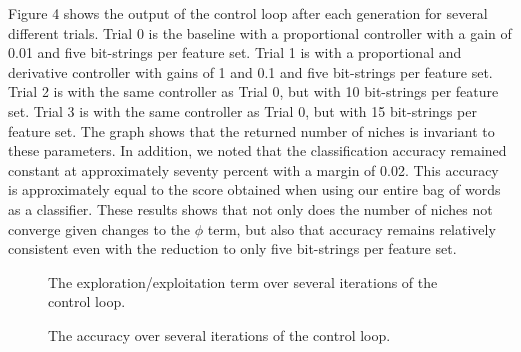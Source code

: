 \documentclass{sig-alternate}
\begin{document}
Figure 4 shows the output of the control loop after each generation for several different trials. Trial 0 is the baseline with a proportional controller with a gain of 0.01 and five bit-strings per feature set. Trial 1 is with a proportional and derivative controller with gains of 1 and 0.1 and five bit-strings per feature set. Trial 2 is with the same controller as Trial 0, but with 10 bit-strings per feature set. Trial 3 is with the same controller as Trial 0, but with 15 bit-strings per feature set. The graph shows that the returned number of niches is invariant to these parameters. In addition, we noted that the classification accuracy remained constant at approximately seventy percent with a margin of 0.02. This accuracy is approximately equal to the score obtained when using our entire bag of words as a classifier. These results shows that not only does the number of niches not converge given changes to the $\phi$ term, but also that accuracy remains relatively consistent even with the reduction to only five bit-strings per feature set.\\
\begin{figure}[t]
\centering
{}
\caption{The exploration/exploitation term over several iterations of the control loop.}
\label{fig:graph3}
\end{figure}
\begin{figure}[t]
\centering
{}
\caption{The accuracy over several iterations of the control loop.}
\label{fig:graph3}
\end{figure}
\end{document}
